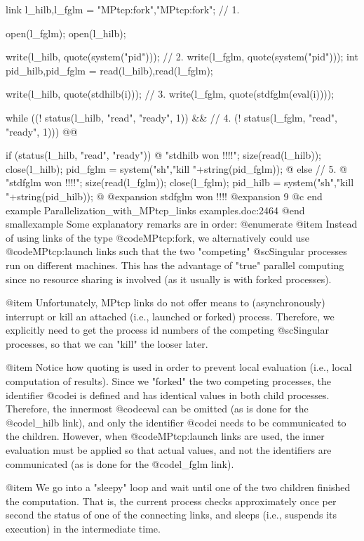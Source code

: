link l_hilb,l_fglm = "MPtcp:fork","MPtcp:fork";         // 1.

open(l_fglm); open(l_hilb);

write(l_hilb, quote(system("pid")));                    // 2.
write(l_fglm, quote(system("pid")));
int pid_hilb,pid_fglm = read(l_hilb),read(l_fglm);

write(l_hilb, quote(stdhilb(i)));                       // 3.
write(l_fglm, quote(stdfglm(eval(i))));

while ((! status(l_hilb, "read", "ready", 1)) &&        // 4.
       (! status(l_fglm, "read", "ready", 1))) @{@}

if (status(l_hilb, "read", "ready"))
@{
  "stdhilb won !!!!"; size(read(l_hilb));
  close(l_hilb); pid_fglm = system("sh","kill "+string(pid_fglm));
@}
else                                                    // 5.
@{
  "stdfglm won !!!!"; size(read(l_fglm));
  close(l_fglm); pid_hilb = system("sh","kill "+string(pid_hilb));
@}
@expansion{} stdfglm won !!!!
@expansion{} 9
@c end example Parallelization_with_MPtcp_links examples.doc:2464
@end smallexample
Some explanatory remarks are in order:
@enumerate
@item
Instead of using links of the type @code{MPtcp:fork}, we alternatively
could use @code{MPtcp:launch} links such that the two "competing"
@sc{Singular} processes run on different machines. This has the
advantage of "true" parallel computing since no resource sharing is
involved (as it usually is with forked processes).

@item
Unfortunately, MPtcp links do not offer means to (asynchronously)
interrupt or kill an attached (i.e., launched or forked)
process. Therefore, we explicitly need to get the process id numbers of
the competing @sc{Singular} processes, so that we can "kill" the
looser later.

@item
Notice how quoting is used in order to prevent local evaluation
(i.e., local computation of results). Since we "forked" the two
competing processes, the identifier @code{i} is defined and has
identical values in both child processes. Therefore, the innermost
@code{eval} can be omitted (as is done for the @code{l_hilb} link),
and only the identifier @code{i} needs to be communicated to the
children. However, when @code{MPtcp:launch} links are used, the inner
evaluation must be applied so that actual values, and not the
identifiers are communicated (as is done for the @code{l_fglm} link).

@item
We go into a "sleepy" loop and wait until one of the two children
finished the computation. That is, the current process checks approximately
once per second the status of one of the connecting links, and sleeps
(i.e., suspends its execution) in the intermediate time.

